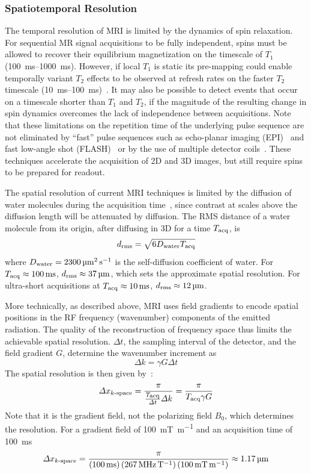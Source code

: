 \subsubsection{Spatiotemporal Resolution}

The temporal resolution of MRI is limited by the dynamics of spin relaxation. For sequential MR signal acquisitions to be fully independent, spins must be allowed to recover their equilibrium magnetization on the timescale of $T_1$ (\SIrange{100}{1000}{\milli\second}).
However, if local $T_1$ is static its pre-mapping could enable temporally variant $T_2$ effects to be observed at refresh rates on the faster $T_2$ timescale (\SIrange{10}{100}{\milli\second})~\cite{deichmann95}.
It may also be possible to detect events that occur on a timescale shorter than $T_1$ and $T_2$, if the magnitude of the resulting change in spin dynamics overcomes the lack of independence between acquisitions.
Note that these limitations on the repetition time of the underlying pulse sequence are not eliminated by ``fast'' pulse sequences such as echo-planar imaging (EPI)~\cite{stehling91} and fast low-angle shot (FLASH)~\cite{haase86} or by the use of multiple detector coils~\cite{wiesinger06}.
These techniques accelerate the acquisition of 2D and 3D images, but still require spins to be prepared for readout.

The spatial resolution of current MRI techniques is limited by the diffusion of water molecules during the acquisition time~\cite{glover02}, since contrast at scales above the diffusion length will be attenuated by diffusion.
The RMS distance of a water molecule from its origin, after diffusing in 3D for a time $T_{\text{\scriptsize acq}}$, is
\[d_{\text{\scriptsize rms}} = \sqrt{6D_{\text{\scriptsize water}}T_{\text{\scriptsize acq}}}\]
where $D_{\text{\scriptsize water}}=\SI{2300}{\micro\meter\squared\per\second}$ is the self-diffusion coefficient of water.
For $T_{\text{\scriptsize acq}}\approx\SI{100}{\milli\second}$, $d_{\text{\scriptsize rms}}\approx\SI{37}{\micro\meter}$, which sets the approximate spatial resolution.
For ultra-short acquisitions at $T_{\text{\scriptsize acq}}\approx\SI{10}{\milli\second}$, $d_{\text{\scriptsize rms}}\approx\SI{12}{\micro\meter}$.

More technically, as described above, MRI uses field gradients to encode spatial positions in the RF frequency (wavenumber) components of the emitted radiation.
The quality of the reconstruction of frequency space thus limits the achievable spatial resolution.
$\Delta t$, the sampling interval of the detector, and the field gradient $G$, determine the wavenumber increment as
\[\Delta k = \gamma G \Delta t\]
The spatial resolution is then given by~\cite{glover02}:
\[\Delta x_{\text{\scriptsize $k$-space}} = \frac{\pi}{\frac{T_{\text{\scriptsize acq}}}{\Delta t} \Delta k} = \frac{\pi}{T_{\text{\scriptsize acq}} \gamma G}\]
Note that it is the gradient field, not the polarizing field $B_0$, which determines the resolution. For a gradient field of \SI{100}{\milli\tesla\per\meter} and an acquisition time of \SI{100}{\milli\second}
\[\Delta x\sub{$k$-space} = \frac{\pi}{\left(\SI{100}{\milli\second}\right)\left(\SI{267}{\MHz\per\tesla}\right)\left(\SI{100}{\milli\tesla\per\meter}\right)}\approx \SI{1.17}{\micro\meter}\]

